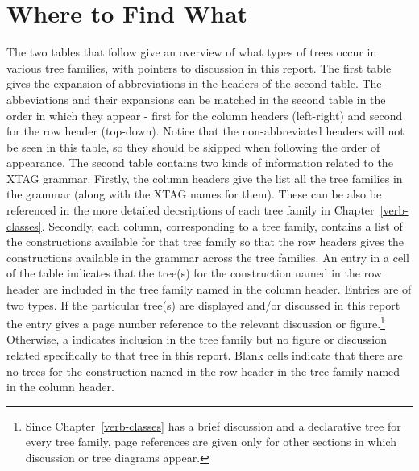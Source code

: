\chapter{Where to Find What}
\label{table-intro}

The two tables that follow give an overview of what types of trees occur in
various tree families, with pointers to discussion in this report.  The
first table gives the expansion of abbreviations in the headers of the
second table. The abbeviations and their expansions can be matched in the
second table in the order in which they appear - first for the column
headers (left-right) and second for the row header (top-down). Notice that
the non-abbreviated headers will not be seen in this table, so they should
be skipped when following the order of appearance. The second table
contains two kinds of information related to the XTAG grammar. Firstly, the
column headers give the list all the tree families in the grammar (along
with the XTAG names for them). These can be also be referenced in the more
detailed decsriptions of each tree family in
Chapter~\ref{verb-classes}. Secondly, each column, corresponding to a tree
family, contains a list of the constructions available for that tree family
so that the row headers gives the constructions available in the grammar
across the tree families. An entry in a cell of the table indicates that
the tree(s) for the construction named in the row header are included in
the tree family named in the column header. Entries are of two types.  If
the particular tree(s) are displayed and/or discussed in this report the
entry gives a page number reference to the relevant discussion or
figure.\footnote{Since Chapter~\ref{verb-classes} has a brief discussion
and a declarative tree for every tree family, page references are given
only for other sections in which discussion or tree diagrams appear.}
Otherwise, a \xtagcheck \space indicates inclusion in the tree family but
no figure or discussion related specifically to that tree in this report.
Blank cells indicate that there are no trees for the construction named in
the row header in the tree family named in the column header.


\vspace{0.3in}

